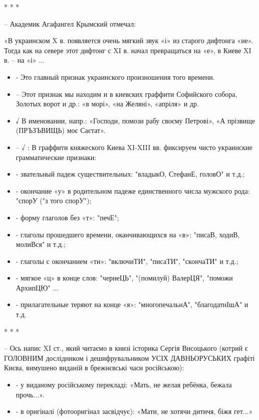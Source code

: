 \begin{itemize}
* * *

– Академик Агафангел Крымский отмечал:

«В украинском X в. появляется очень мягкий звук «і» из старого дифтонга «ие».
Тогда как на севере этот дифтонг с XI в. начал превращаться на «е», в Киеве XI
в. – на «і» ...

\begin{itemize}
  \item - Это главный признак украинского произношения того времени.
  \item – Этот признак мы находим и в киевских граффити Софийского собора, Золотых ворот и др.: «в морі», «на Желяні», «апріля» и др.
  \item √ В именовании, напр.: «Господи, помози рабу своєму Петрові», «А прізвище (ПРЪЗЪВИЩЬ) моє Саєтат».
  \item – √ : В граффити княжеского Киева XI-XIII вв. фиксируем чисто украинские грамматические признаки:
  \item - звательный падеж существительных: "владыкО, СтефанЕ, головО" и т.д.;
  \item - окончание «у» в родительном падеже единственного числа мужского рода: "спорУ ("з того спорУ");
  \item - форму глаголов без «т»: "печЕ";
  \item - глаголы прошедшего времени, оканчивающихся на «в»: "писаВ, ходиВ, молиВся" и т.д.;
  \item - глаголы с окончанием «ти»: "включиТИ", "писаТИ", "скончаТИ" и т.д.;
  \item - мягкое «ц» в конце слов: "чернеЦЬ", "(помилуй) ВалерЦЯ", "поможи АрхипЦЮ" ...
  \item - прилагательные теряют на конце «я»: "многопечальнА", "благодатнІшА" и т.д.
\end{itemize}

* * *

– Ось напис XI ст., який читаємо в книзі історика Сергія Висоцького (котрий є
ГОЛОВНИМ дослідником і дешифрувальником УСІХ ДАВНЬОРУСЬКИХ графіті Києва,
вимушено виданій в брежнєвські часи російською):

\begin{itemize}
  \item - у виданому російському перекладі: «Мать, не желая ребёнка, бежала прочь...».
  \item - в оригіналі (фотооригінал засвідчує): «Мати, не хотячи дитичя, біжя гет...»
\end{itemize}


\end{itemize}

